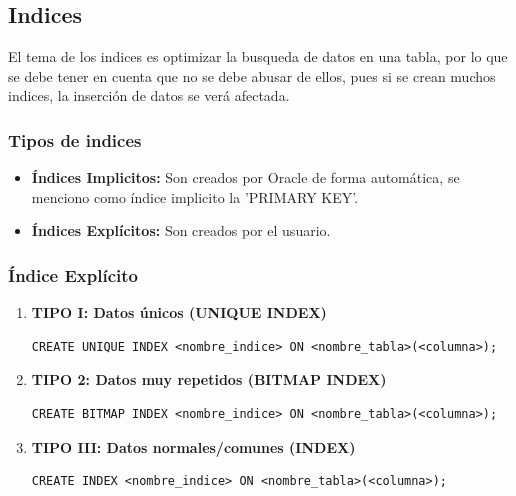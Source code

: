\documentclass{templateNote}
\begin{document}
\subsection{Indices}
El tema de los indices es optimizar la busqueda de datos en una tabla, por lo que se debe tener en cuenta que no se debe abusar de ellos, pues si se crean muchos indices, la inserción de datos se verá afectada.
\subsubsection{Tipos de indices}
\begin{itemize}
    \item \textbf{\'Indices Implicitos:} Son creados por Oracle de forma automática, se menciono como \'indice implicito la 'PRIMARY KEY'.
    \item \textbf{\'Indices Explícitos:} Son creados por el usuario.
\end{itemize}
\subsubsection*{\'Indice Explícito}
\begin{enumerate}
    \item \textbf{TIPO I: Datos \'unicos (UNIQUE INDEX)}
    \begin{tcolorbox}[
        colframe=Verde!100, %
        colback=Verde!20,       %
        coltitle=black!100, %
        title=\textbf{PL/SQL}, %
    ]
        \begin{verbatim}
CREATE UNIQUE INDEX <nombre_indice> ON <nombre_tabla>(<columna>);
        \end{verbatim}
    \end{tcolorbox}

    \item \textbf{TIPO 2: Datos muy repetidos (BITMAP INDEX)}
    \begin{tcolorbox}[
        colframe=Verde!100, %
        colback=Verde!20,       %
        coltitle=black!100, %
        title=\textbf{PL/SQL}, %
    ]
        \begin{verbatim}
CREATE BITMAP INDEX <nombre_indice> ON <nombre_tabla>(<columna>);
        \end{verbatim}
    \end{tcolorbox}

    \item \textbf{TIPO III: Datos normales/comunes (INDEX)} 
    \begin{tcolorbox}[
        colframe=Verde!100, %
        colback=Verde!20,       %
        coltitle=black!100, %
        title=\textbf{PL/SQL}, %
    ]
        \begin{verbatim}
CREATE INDEX <nombre_indice> ON <nombre_tabla>(<columna>);
        \end{verbatim}
    \end{tcolorbox}
\end{enumerate}
\end{document}
